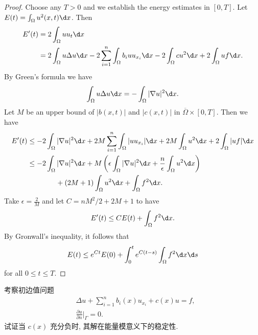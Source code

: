 \begin{proof}
  Choose any $T>0$ and we establish the energy estimates in $[0,T]$.
  Let $E(t) = \int_{\Omega} u^2(x,t) \d x$. Then
  \begin{align*}
    E'(t)
    & = 2\int_{\Omega} uu_t \d x \\
    & = 2\int_{\Omega}u\Delta u\d x
        - 2\sum_{i=1}^n\int_{\Omega}b_iuu_{x_i}\d x
        - 2\int_{\Omega}cu^2\d x+2\int_{\Omega}uf\d x.
  \end{align*}
  By Green's formula we have
  \[ \int_{\Omega} u\Delta u \d x = -\int_{\Omega}|\nabla u|^2\d x. \]
  Let $M$ be an upper bound of $|b(x,t)|$ and $|c(x,t)|$
  in $\overline{\Omega}\times [0,T]$. Then we have
  \begin{align*}
    E'(t)
    & \leq -2\int_{\Omega}|\nabla u|^2\d x
      + 2M \sum_{i=1}^n\int_{\Omega}|uu_{x_i}|\d x
      + 2M \int_{\Omega}u^2\d x+2\int_{\Omega}|uf|\d x \\
    & \leq -2\int_{\Omega}|\nabla u|^2\d x
        + M \left(\epsilon\int_{\Omega}|\nabla u|^2\d x
        + \frac{n}{\epsilon}\int_{\Omega}u^2\d x\right) \\
    & \qquad\qquad + (2M+1)\int_{\Omega}u^2\d x+\int_{\Omega}f^2\d x.
  \end{align*}
  Take $\epsilon = \frac{2}{M}$ and let $C = nM^2/2 + 2M + 1$ to have
  \[ E'(t) \leq CE(t) + \int_{\Omega} f^2 \d x. \]
  By Gronwall's inequality, it follows that
  \[ E(t) \leq e^{Ct}E(0) + \int_0^t e^{C(t-s)} \int_{\Omega} f^2 \d x\d s\]
  for all $0\leq t\leq T$.
\end{proof}


\begin{exercise}
  考察初边值问题
  \begin{align*}
    & \Delta u + \sum_{i=1}^{n} b_i(x) u_{x_i} + c(x)u = f, \\
    & \frac{\partial u}{\partial n}\bigg|_{\varGamma} = 0.
  \end{align*}
  试证当 $c(x)$ 充分负时, 其解在能量模意义下的稳定性.
\end{exercise}

